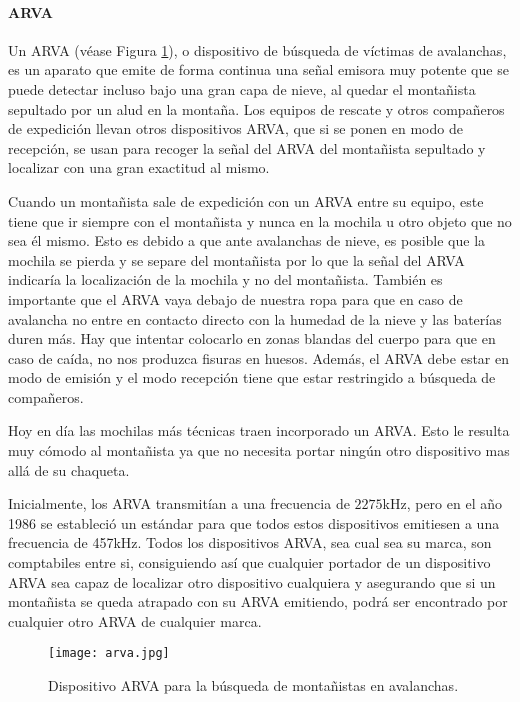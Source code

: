 \paragraph{\acs{ARVA}}

Un \ac{ARVA} (véase Figura \ref{fig:arva}), o dispositivo de búsqueda de víctimas de avalanchas, es un aparato que emite de forma continua una señal emisora muy potente que se puede detectar incluso bajo una gran capa de nieve, al quedar el montañista sepultado por un alud en la montaña. Los equipos de rescate y otros compañeros de expedición llevan otros dispositivos \ac{ARVA}, que si se ponen en modo de recepción, se usan para recoger la señal del \ac{ARVA} del montañista sepultado y localizar con una gran exactitud al mismo. 

Cuando un montañista sale de expedición con un \ac{ARVA} entre su equipo, este tiene que ir siempre con el montañista y nunca en la mochila u otro objeto que no sea él mismo. Esto es debido a que ante avalanchas de nieve, es posible que la mochila se pierda y se separe del montañista por lo que la señal del \ac{ARVA} indicaría la localización de la mochila y no del montañista. También es importante que el \ac{ARVA} vaya debajo de nuestra ropa para que en caso de avalancha no entre en contacto directo con la humedad de la nieve y las baterías duren más. Hay que intentar colocarlo en zonas blandas del cuerpo para que en caso de caída, no nos produzca fisuras en huesos. Además, el \ac{ARVA} debe estar en modo de emisión y el modo recepción tiene que estar restringido a búsqueda de compañeros. 

Hoy en día las mochilas más técnicas traen incorporado un \ac{ARVA}. Esto le resulta muy cómodo al montañista ya que no necesita portar ningún otro dispositivo mas allá de su chaqueta. 

Inicialmente, los \ac{ARVA} transmitían a una frecuencia de $2275$kHz, pero en el año 1986 se estableció un estándar para que todos estos dispositivos emitiesen a una frecuencia de 457kHz. Todos los dispositivos \ac{ARVA}, sea cual sea su marca, son comptabiles entre si, consiguiendo así que cualquier portador de un dispositivo \ac{ARVA} sea capaz de localizar otro dispositivo cualquiera y asegurando que si un montañista se queda atrapado con su \ac{ARVA} emitiendo, podrá ser encontrado por cualquier otro \ac{ARVA} de cualquier marca. 

\begin{figure}[!h]
\begin{center}
\texttt{[image: arva.jpg]}
\caption{Dispositivo \ac{ARVA} para la búsqueda de montañistas en avalanchas. \protect\footnotemark}
\label{fig:arva}
\end{center}
\end{figure}

